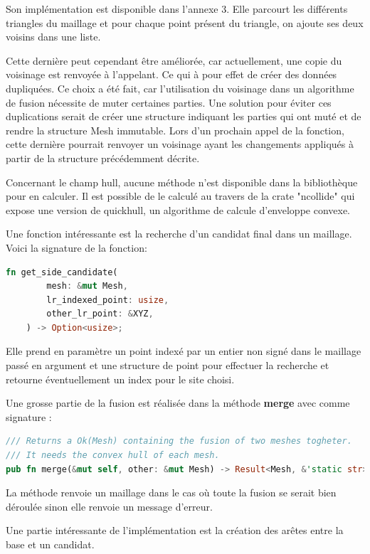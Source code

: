 Son implémentation est disponible dans l'annexe 3. 
Elle parcourt les différents triangles du maillage et pour chaque point présent du triangle, on ajoute ses deux voisins dans une liste.

Cette dernière peut cependant
être améliorée, car actuellement, une copie du voisinage est renvoyée à
l'appelant. Ce qui à pour effet de créer des données dupliquées. Ce choix a été
fait, car l'utilisation du voisinage dans un algorithme de fusion nécessite de
muter certaines parties. Une solution pour éviter ces duplications serait de créer
une structure indiquant les parties qui ont muté et de rendre la structure Mesh
immutable. Lors d'un prochain appel de la fonction, cette dernière pourrait
renvoyer un voisinage ayant les changements appliqués à partir de la structure
précédemment décrite.  

Concernant le champ hull, aucune méthode n'est disponible dans la bibliothèque pour en calculer. Il est possible de le calculé au travers de la crate "ncollide" qui expose une version de quickhull, un algorithme de calcule d'enveloppe convexe.

Une fonction intéressante est la recherche d'un candidat final dans un maillage. Voici la signature de la fonction:
\begin{lstlisting}[language=Rust, style=boxed]
fn get_side_candidate(
        mesh: &mut Mesh,
        lr_indexed_point: usize,
        other_lr_point: &XYZ,
    ) -> Option<usize>;
\end{lstlisting}

Elle prend en paramètre un point indexé par un entier non signé dans le maillage passé en argument et une structure de point pour effectuer la recherche et retourne éventuellement un index pour le site choisi.

Une grosse partie de la fusion est réalisée dans la méthode \textbf{merge} avec comme signature : 
\begin{lstlisting}[language=Rust, style=boxed]
/// Returns a Ok(Mesh) containing the fusion of two meshes togheter.
/// It needs the convex hull of each mesh.
pub fn merge(&mut self, other: &mut Mesh) -> Result<Mesh, &'static str>;
\end{lstlisting}

La méthode renvoie un maillage dans le cas où toute la fusion se serait bien déroulée sinon elle renvoie un message d'erreur.

Une partie intéressante de l'implémentation est la création des arêtes entre la base et un candidat.


